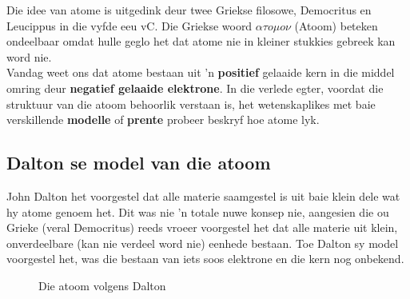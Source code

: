 
      \label{m38756*id254508}
Die idee van atome is uitgedink deur twee Griekse filosowe, Democritus en Leucippus in die vyfde eeu vC. Die Griekse woord $\alpha \tau o\mu o\nu $ (Atoom) beteken ondeelbaar omdat hulle geglo het dat atome nie in kleiner stukkies gebreek kan word nie.\\
      \label{m38756*id254540}
Vandag weet ons dat atome bestaan uit 'n \textbf{positief} gelaaide kern in die middel omring deur \textbf{negatief gelaaide elektrone}. In die verlede egter, voordat die struktuur van die atoom behoorlik verstaan is, het wetenskaplikes met baie verskillende \textbf{modelle} of \textbf{prente} probeer beskryf hoe atome lyk.

\subsection*{Dalton se model van die atoom}
\begin{minipage}{.5\textwidth}
John Dalton het voorgestel dat alle materie saamgestel is uit baie klein dele wat hy atome genoem het. Dit was nie 'n totale nuwe konsep nie, aangesien die ou Grieke (veral Democritus) reeds vroeer voorgestel het dat alle materie uit klein, onverdeelbare (kan nie verdeel word nie) eenhede bestaan. Toe Dalton sy model voorgestel het, was die bestaan van iets soos elektrone en die kern nog onbekend. 
\end{minipage}
\begin{minipage}{.5\textwidth}
	\begin{figure}[H] %
    \begin{center}
\caption{Die atoom volgens Dalton}
\end{center}
 \end{figure}
\end{minipage}

